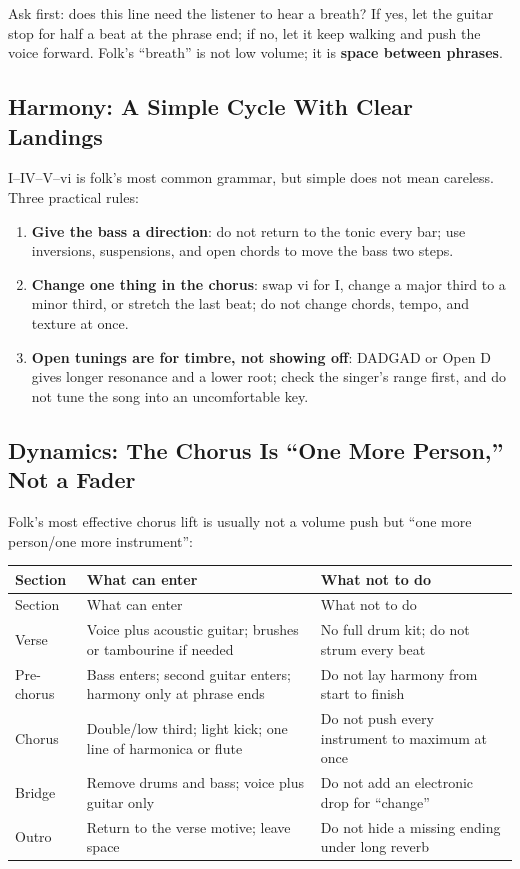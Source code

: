 Ask first: does this line need the listener to hear a breath? If yes, let the guitar stop for half a beat at the phrase end; if no, let it keep walking and push the voice forward. Folk's ``breath'' is not low volume; it is \textbf{space between phrases}.

\subsection{Harmony: A Simple Cycle With Clear Landings}
\label{sec:folk-harmony}

I--IV--V--vi is folk's most common grammar, but simple does not mean careless. Three practical rules:

\begin{enumerate}
\item \textbf{Give the bass a direction}: do not return to the tonic every bar; use inversions, suspensions, and open chords to move the bass two steps.
\item \textbf{Change one thing in the chorus}: swap vi for I, change a major third to a minor third, or stretch the last beat; do not change chords, tempo, and texture at once.
\item \textbf{Open tunings are for timbre, not showing off}: DADGAD or Open D gives longer resonance and a lower root; check the singer's range first, and do not tune the song into an uncomfortable key.
\end{enumerate}

\subsection{Dynamics: The Chorus Is ``One More Person,'' Not a Fader}
\label{sec:folk-dynamic}

Folk's most effective chorus lift is usually not a volume push but ``one more person/one more instrument'':

\begin{longtable}{p{}p{}p{}}
\toprule
Section & What can enter & What not to do \\
\midrule
\endfirsthead
\toprule
Section & What can enter & What not to do \\
\midrule
\endhead
Verse & Voice plus acoustic guitar; brushes or tambourine if needed & No full drum kit; do not strum every beat \\
Pre-chorus & Bass enters; second guitar enters; harmony only at phrase ends & Do not lay harmony from start to finish \\
Chorus & Double/low third; light kick; one line of harmonica or flute & Do not push every instrument to maximum at once \\
Bridge & Remove drums and bass; voice plus guitar only & Do not add an electronic drop for ``change'' \\
Outro & Return to the verse motive; leave space & Do not hide a missing ending under long reverb \\
\bottomrule
\end{longtable}

